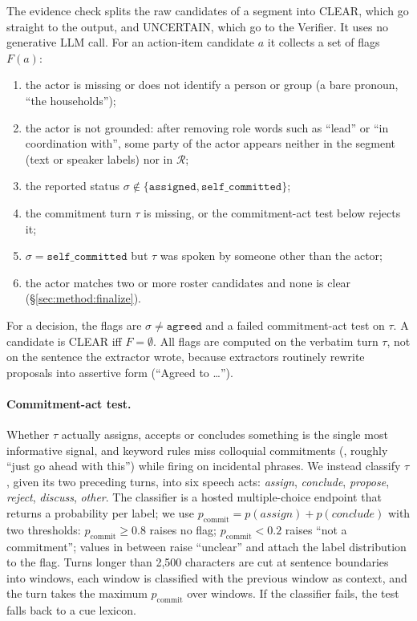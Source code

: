 The evidence check splits the raw candidates of a segment into CLEAR, which go straight to the output, and UNCERTAIN, which go to the Verifier.
It uses no generative LLM call.
For an action-item candidate $a$ it collects a set of flags $F(a)$:
\begin{enumerate}[nosep,leftmargin=*,label=(\arabic*)]
  \item the actor is missing or does not identify a person or group (a bare pronoun, ``the households'');
  \item the actor is not grounded: after removing role words such as ``lead'' or ``in coordination with'', some party of the actor appears neither in the segment (text or speaker labels) nor in $\mathcal{R}$;
  \item the reported status $\sigma\notin\{\texttt{assigned},\texttt{self\_committed}\}$;
  \item the commitment turn $\tau$ is missing, or the commitment-act test below rejects it;
  \item $\sigma=\texttt{self\_committed}$ but $\tau$ was spoken by someone other than the actor;
  \item the actor matches two or more roster candidates and none is clear (\S\ref{sec:method:finalize}).
\end{enumerate}
For a decision, the flags are $\sigma\neq\texttt{agreed}$ and a failed commitment-act test on $\tau$.
A candidate is CLEAR iff $F=\emptyset$.
All flags are computed on the verbatim turn $\tau$, not on the sentence the extractor wrote, because extractors routinely rewrite proposals into assertive form (``Agreed to \ldots'').

\paragraph{Commitment-act test.}
Whether $\tau$ actually assigns, accepts or concludes something is the single most informative signal, and keyword rules miss colloquial commitments (, roughly ``just go ahead with this'') while firing on incidental phrases.
We instead classify $\tau$, given its two preceding turns, into six speech acts: \emph{assign}, \emph{conclude}, \emph{propose}, \emph{reject}, \emph{discuss}, \emph{other}.
The classifier is a hosted multiple-choice endpoint that returns a probability per label; we use $p_{\text{commit}}=p(\textit{assign})+p(\textit{conclude})$ with two thresholds:
$p_{\text{commit}}\ge 0.8$ raises no flag; $p_{\text{commit}}<0.2$ raises ``not a commitment''; values in between raise ``unclear'' and attach the label distribution to the flag.
Turns longer than 2{,}500 characters are cut at sentence boundaries into windows, each window is classified with the previous window as context, and the turn takes the maximum $p_{\text{commit}}$ over windows.
If the classifier fails, the test falls back to a cue lexicon.

